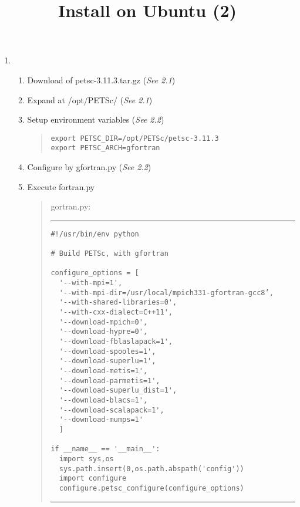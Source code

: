 \documentclass[12pt]{article}
\begin{document}
\title{Install on Ubuntu (2)}
\begin{enumerate}
\item
\begin{enumerate}
\item
Download of petsc-3.11.3.tar.gz \qquad (\textit{See 2.1})
\item
Expand at /opt/PETSc/ \qquad (\textit{See 2.1})
\item
Setup environment variables \qquad (\textit{See 2.2})
\begin{quote}
\begin{verbatim}
export PETSC_DIR=/opt/PETSc/petsc-3.11.3
export PETSC_ARCH=gfortran
\end{verbatim}
\end{quote}
\item
Configure by gfortran.py  \qquad (\textit{See 2.2})
\item
Execute fortran.py

\begin{quote}
gortran.py:
\hrule
\begin{verbatim}
#!/usr/bin/env python

# Build PETSc, with gfortran

configure_options = [
  '--with-mpi=1',
  '--with-mpi-dir=/usr/local/mpich331-gfortran-gcc8’,
  '--with-shared-libraries=0',
  '--with-cxx-dialect=C++11',
  '--download-mpich=0',
  '--download-hypre=0',
  '--download-fblaslapack=1',
  '--download-spooles=1',
  '--download-superlu=1',
  '--download-metis=1',
  '--download-parmetis=1',
  '--download-superlu_dist=1',
  '--download-blacs=1',
  '--download-scalapack=1',
  '--download-mumps=1'
  ]

if __name__ == '__main__':
  import sys,os
  sys.path.insert(0,os.path.abspath('config'))
  import configure
  configure.petsc_configure(configure_options)
\end{verbatim}
\hrule
\end{quote}
\end{enumerate}
\end{enumerate}
\end{document}
